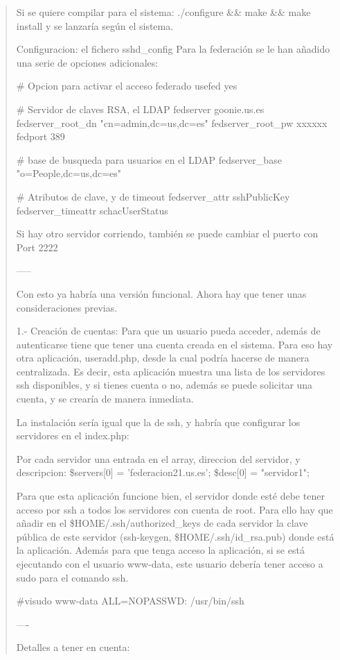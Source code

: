 \begin{quote}
Si se quiere compilar para el sistema:
./configure \&\& make \&\& make install
y se lanzaría según el sistema.

Configuracion: el fichero sshd\_config
Para la federación se le han añadido una serie de opciones adicionales:

\# Opcion para activar el acceso federado
usefed yes

\# Servidor de claves RSA, el LDAP
fedserver goonie.us.es
fedserver\_root\_dn "cn=admin,dc=us,dc=es"
fedserver\_root\_pw xxxxxx
fedport 389

\# base de busqueda para usuarios en el LDAP
fedserver\_base "o=People,dc=us,dc=es"

\# Atributos de clave, y de timeout
fedserver\_attr sshPublicKey
fedserver\_timeattr schacUserStatus

Si hay otro servidor corriendo, también se puede cambiar el puerto con
Port 2222

-----

Con esto ya habría una versión funcional. Ahora hay que tener unas
consideraciones previas.

1.- Creación de cuentas:
Para que un usuario pueda acceder, además de autenticarse tiene que
tener una cuenta creada en el sistema. Para eso hay otra aplicación,
useradd.php, desde la cual podría hacerse de manera centralizada. Es
decir, esta aplicación muestra una lista de los servidores ssh
disponibles, y si tienes cuenta o no, además se puede solicitar una
cuenta, y se crearía de manera inmediata.

La instalación sería igual que la de ssh, y habría que configurar los
servidores en el index.php:

Por cada servidor una entrada en el array, direccion del servidor, y
descripcion:
\$servers[0] = 'federacion21.us.es';
\$desc[0] = "servidor1";

Para que esta aplicación funcione bien, el servidor donde esté debe
tener acceso por ssh a todos los servidores con cuenta de root. Para
ello hay que añadir en el \$HOME/.ssh/authorized\_keys de cada servidor la
clave pública de este servidor (ssh-keygen, \$HOME/.ssh/id\_rsa.pub) donde
está la aplicación.
Además para que tenga acceso la aplicación, si se está ejecutando con el
usuario www-data, este usuario debería tener acceso a sudo para el
comando ssh.

\#visudo
www-data ALL=NOPASSWD: /usr/bin/ssh

----

Detalles a tener en cuenta:


\end{quote}
